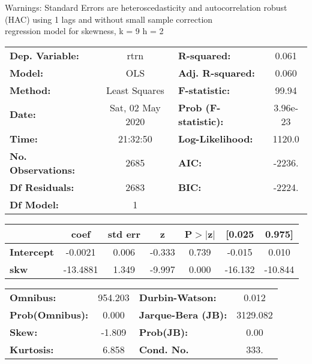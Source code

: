 Warnings: \newline
 [1] Standard Errors are heteroscedasticity and autocorrelation robust (HAC) using 1 lags and without small sample correction\\ 

regression model for skewness, k = 9 h = 2\begin{center}
\begin{tabular}{lclc}
\toprule
\textbf{Dep. Variable:}    &       rtrn       & \textbf{  R-squared:         } &     0.061   \\
\textbf{Model:}            &       OLS        & \textbf{  Adj. R-squared:    } &     0.060   \\
\textbf{Method:}           &  Least Squares   & \textbf{  F-statistic:       } &     99.94   \\
\textbf{Date:}             & Sat, 02 May 2020 & \textbf{  Prob (F-statistic):} &  3.96e-23   \\
\textbf{Time:}             &     21:32:50     & \textbf{  Log-Likelihood:    } &    1120.0   \\
\textbf{No. Observations:} &        2685      & \textbf{  AIC:               } &    -2236.   \\
\textbf{Df Residuals:}     &        2683      & \textbf{  BIC:               } &    -2224.   \\
\textbf{Df Model:}         &           1      & \textbf{                     } &             \\
\bottomrule
\end{tabular}
\begin{tabular}{lcccccc}
                   & \textbf{coef} & \textbf{std err} & \textbf{z} & \textbf{P$> |$z$|$} & \textbf{[0.025} & \textbf{0.975]}  \\
\midrule
\textbf{Intercept} &      -0.0021  &        0.006     &    -0.333  &         0.739        &       -0.015    &        0.010     \\
\textbf{skw}       &     -13.4881  &        1.349     &    -9.997  &         0.000        &      -16.132    &      -10.844     \\
\bottomrule
\end{tabular}
\begin{tabular}{lclc}
\textbf{Omnibus:}       & 954.203 & \textbf{  Durbin-Watson:     } &    0.012  \\
\textbf{Prob(Omnibus):} &   0.000 & \textbf{  Jarque-Bera (JB):  } & 3129.082  \\
\textbf{Skew:}          &  -1.809 & \textbf{  Prob(JB):          } &     0.00  \\
\textbf{Kurtosis:}      &   6.858 & \textbf{  Cond. No.          } &     333.  \\
\bottomrule
\end{tabular}
\end{center}

